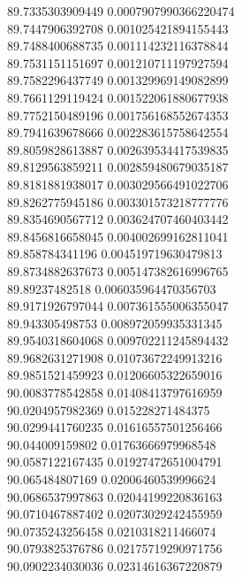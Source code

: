 {89.7335303909449 0.0007907990366220474 \\
89.7447906392708 0.001025421894155443 \\
89.7488400688735 0.001114232116378844 \\
89.7531151151697 0.001210711197927594 \\
89.7582296437749 0.001329969149082899 \\
89.7661129119424 0.001522061880677938 \\
89.7752150489196 0.001756168552674353 \\
89.7941639678666 0.002283615758642554 \\
89.8059828613887 0.002639534417539835 \\
89.8129563859211 0.002859480679035187 \\
89.8181881938017 0.003029566491022706 \\
89.8262775945186 0.003301573218777776 \\
89.8354690567712 0.003624707460403442 \\
89.8456816658045 0.004002699162811041 \\
89.858784341196 0.004519719630479813 \\
89.8734882637673 0.005147382616996765 \\
89.89237482518 0.006035964470356703 \\
89.9171926797044 0.007361555006355047 \\
89.943305498753 0.008972059935331345 \\
89.9540318604068 0.009702211245894432 \\
89.9682631271908 0.01073672249913216 \\
89.9851521459923 0.01206605322659016 \\
90.0083778542858 0.01408413797616959 \\
90.0204957982369 0.015228271484375 \\
90.0299441760235 0.01616557501256466 \\
90.044009159802 0.01763666979968548 \\
90.0587122167435 0.01927472651004791 \\
90.065484807169 0.02006460539996624 \\
90.0686537997863 0.02044199220836163 \\
90.0710467887402 0.02073029242455959 \\
90.0735243256458 0.0210318211466074 \\
90.0793825376786 0.02175719290971756 \\
90.0902234030036 0.02314616367220879 \\
}
